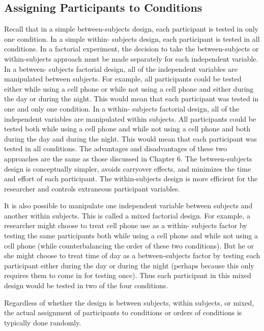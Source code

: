 \subsection{Assigning Participants to Conditions}

Recall that in a simple between-subjects design, each participant is tested in only one condition. In a simple within- subjects design, each participant is tested in all conditions. In a factorial experiment, the decision to take the between-subjects or within-subjects approach must be made separately for each independent variable. In a between- subjects factorial design, all of the independent variables are manipulated between subjects. For example, all participants could be tested either while using a cell phone or while not using a cell phone and either during the day or during the night. This would mean that each participant was tested in one and only one condition. In a within- subjects factorial design, all of the independent variables are manipulated within subjects. All participants could be tested both while using a cell phone and while not using a cell phone and both during the day and during the night. This would mean that each participant was tested in all conditions. The advantages and disadvantages of these two approaches are the same as those discussed in Chapter 6. The between-subjects design is conceptually simpler, avoids carryover effects, and minimizes the time and effort of each participant. The within-subjects design is more efficient for the researcher and controls extraneous participant variables.
 

It is also possible to manipulate one independent variable between subjects and another within subjects. This is called a mixed factorial design. For example, a researcher might choose to treat cell phone use as a within- subjects factor by testing the same participants both while using a cell phone and while not using a cell phone (while counterbalancing the order of these two conditions). But he or she might choose to treat time of day as a between-subjects factor by testing each participant either during the day or during the night (perhaps because this only requires them to come in for testing once). Thus each participant in this mixed design would be tested in two of the four conditions.

Regardless of whether the design is between subjects, within subjects, or mixed, the actual assignment of participants to conditions or orders of conditions is typically done randomly.

